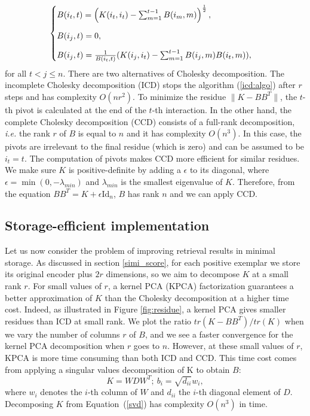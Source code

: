 \begin{align}
\begin{cases}
\vspace{3 mm}
B(i_t, t) = \left(K(i_t,i_t)-\sum_{m=1}^{t-1} B(i_{m},m)  \right)^{\frac{1}{2}},\\
\vspace{3 mm}
B(i_j,t) = 0,\\
B(i_j, t) = \frac{1}{B(i_t,t)}(K(i_j,i_t)  -\sum_{m=1}^{t-1}B(i_j,m)B(i_t,m)), \end{cases}\label{icd:algo}
\end{align}
for all $t<j\le n$. There are two alternatives of Cholesky decomposition. The incomplete Cholesky decomposition (ICD) stops the algorithm (\ref{icd:algo}) after $r$ steps and has complexity $O(nr^2)$. To minimize the residue $\|K-BB^T\|$, the $t$-th pivot is calculated at the end of the $t$-th interaction. In the other hand, the complete Cholesky decomposition (CCD) consists of a full-rank decomposition, \textit{i.e.} the rank $r$ of $B$ is equal to $n$ and it has complexity $O(n^3)$. In this case, the pivots are irrelevant to the final residue (which is zero) and can be assumed to be $i_t=t$. The computation of pivots makes CCD more efficient for similar residues.
We make sure $K$ is positive-definite by adding a $\epsilon$ to its diagonal, where $\epsilon=\min(0,-\lambda_{min})$ and $\lambda_{min}$ is the smallest eigenvalue of $K$. Therefore, from the equation $BB^T=K+\epsilon\mathrm{Id}_n$, $B$ has rank $n$ and we can apply CCD.

\subsection{Storage-efficient implementation}\label{low-rank} %
Let us now consider the problem of improving retrieval results in minimal storage. As discussed in section \ref{simi_score}, for each positive exemplar we store its original encoder plus $2r$ dimensions, so we aim to decompose $K$ at a small rank $r$.
For small values of $r$, a kernel PCA (KPCA) factorization guarantees a better approximation of $K$ than the Cholesky decomposition at a higher time cost. Indeed, as illustrated in Figure \ref{fig:residue}, a kernel PCA gives smaller residues than ICD at small rank. We plot the ratio $tr(K-BB^T)/tr(K)$ when we vary the number of columns $r$ of $B$, and we see a faster convergence for the kernel PCA decomposition when $r$ goes to $n$. However, at these small values of $r$, KPCA is more time consuming than both ICD and CCD. This time cost comes from applying a singular values decomposition of K to obtain $B$:
\begin{equation}
    K = WDW^T; \ b_i = \sqrt{d_{ii}}w_i, \label{svd}
\end{equation}
where $w_i$ denotes the $i$-th column of $W$ and $d_{ii}$ the $i$-th diagonal element of $D$. Decomposing $K$ from Equation~(\ref{svd}) has complexity $O(n^3)$ in time. 

